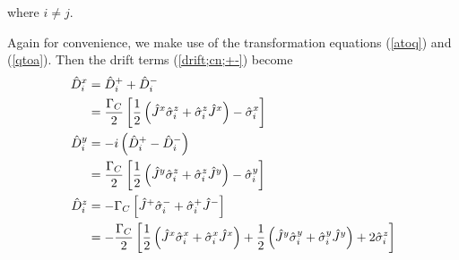 \documentclass{article}
\newcommand{\gc}{\Gamma_C}
\begin{document}
 where $i\neq j$.
 
 Again for convenience, we make use of the transformation equations (\ref{atoq}) and (\ref{qtoa}). Then the drift terms (\ref{drift;cn;+-}) become
 \begin{align}
    \label{drift;cn;xy}
    \notag \hat{D}_i^x & = \hat{D}_i^++\hat{D}_i^-\\
    \notag           & = \frac{\gc}{2}\left[\frac{1}{2}\left(\hat{J}^x\hat{\sigma}_i^z+\hat{\sigma}_i^z\hat{J}^x\right)-\hat{\sigma}_i^x\right]\\
    \notag \hat{D}_i^y & = -i \left(\hat{D}_i^+-\hat{D}_i^-\right) \\
                & = \frac{\gc}{2}\left[\frac{1}{2}\left(\hat{J}^y\hat{\sigma}_i^z+\hat{\sigma}_i^z\hat{J}^y\right)-\hat{\sigma}_i^y\right]\\
    \notag \hat{D}_i^z & = -\gc \left[\hat{J}^+ \hat{\sigma}_i^- + \hat{\sigma}_i^+\hat{J}^-\right]\\
    \notag & = -\frac{\gc}{2}\left[\frac{1}{2}\left(\hat{J}^x\hat{\sigma}_i^x+\hat{\sigma}_i^x\hat{J}^x\right)+\frac{1}{2}\left(\hat{J}^y\hat{\sigma}_i^y+\hat{\sigma}_i^y\hat{J}^y\right)+2\hat{\sigma}_i^z\right]
\end{align}
 
\end{document}
